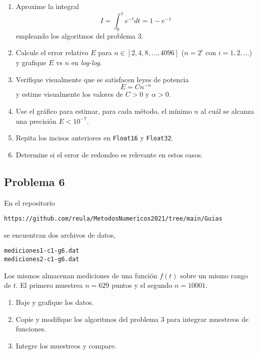 \documentclass[11pt]{article}
\begin{document}
\begin{enumerate}
\def\labelenumi{\arabic{enumi}.}
\item
  Aproxime la integral \begin{equation*}
  I = \int_0^1 e^{-t} dt = 1 - e^{-1}  \nonumber              
  \end{equation*} empleando los algoritmos del problema 3.
\item
  Calcule el error relativo \(E\) para \(n\in [2,4,8,...,4096]\)
  (\(n=2^i\) con \(i=1,2,...\)) y grafique \(E\) vs \(n\) en
  \emph{log-log}.
\item
  Verifique visualmente que se satisfacen leyes de potencia \[
  E = Cn^{-\alpha}
  \] y estime visualmente los valores de \(C>0\) y \(\alpha>0\).
\item
  Use el gráfico para estimar, para cada método, el mínimo \(n\) al cuál
  se alcanza una precisión \(E<10^{-7}\).
\item
  Repita los incisos anteriores en \texttt{Float16} y \texttt{Float32}.
\item
  Determine si el error de redondeo es relevante en estos casos.
\end{enumerate}

    \hypertarget{problema-6}{%
\subsection*{Problema 6}\label{problema-6}}

En el repositorio

\begin{verbatim}
https://github.com/reula/MetodosNumericos2021/tree/main/Guias
\end{verbatim}

se encuentran dos archivos de datos,

\begin{verbatim}
mediciones1-c1-g6.dat 
mediciones2-c1-g6.dat
\end{verbatim}

Los mismos almacenan mediciones de una función \(f(t)\) sobre un mismo
rango de \(t\). El primero muestrea \(n=629\) puntos y el segundo
\(n=10001\).

\begin{enumerate}
\def\labelenumi{\arabic{enumi}.}
\item
  Baje y grafique los datos.
\item
  Copie y modifique los algoritmos del problema 3 para integrar
  muestreos de funciones.
\item
  Integre los muestreos y compare.
\end{enumerate}
\end{document}
